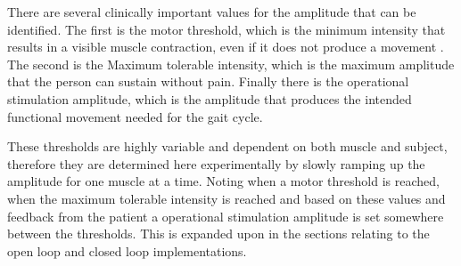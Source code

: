 There are several clinically important values for the amplitude that can be identified. The first is the motor threshold, which is the minimum intensity  that results in a visible muscle contraction, even if it does not produce a movement \cite{marquez-chin_functional_2020}. The second is the Maximum tolerable intensity, which is the maximum amplitude that the person can sustain without pain. Finally there is the operational stimulation amplitude, which is the amplitude that produces the intended functional movement needed for the gait cycle. 

These thresholds are highly variable and dependent on both muscle and subject, therefore they are determined here experimentally by slowly ramping up the amplitude for one muscle at a time. Noting when a motor threshold is reached, when the maximum tolerable intensity is reached and based on these values and feedback from the patient a operational stimulation amplitude is set somewhere between the thresholds. This is expanded upon in the sections relating to the open loop and closed loop implementations.

